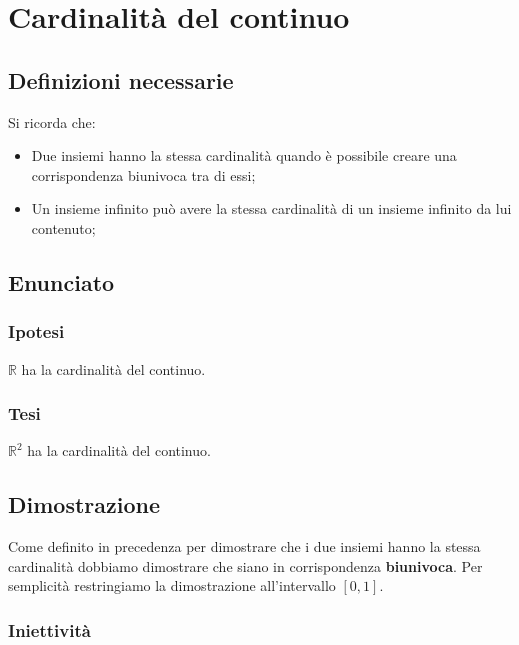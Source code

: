 \documentclass[../dimostrazioni]{subfiles}
\begin{document}
    \chapter{Cardinalità del continuo}

        \section*{Definizioni necessarie}

            Si ricorda che:

            \begin{itemize}
                \item Due insiemi hanno la stessa cardinalità quando è possibile creare una corrispondenza biunivoca tra di essi;
                \item Un insieme infinito può avere la stessa cardinalità di un insieme infinito da lui contenuto;
            \end{itemize}

        \section*{Enunciato}

            \subsection*{Ipotesi}

            \( \mathbb{R} \) ha la cardinalità del continuo.

            \subsection*{Tesi}

            \( \mathbb{R}^2 \) ha la cardinalità del continuo.                

        \section*{Dimostrazione}

            Come definito in precedenza per dimostrare che i due insiemi hanno la stessa cardinalità 
            dobbiamo dimostrare che siano in corrispondenza \textbf{biunivoca}. 
            Per semplicità restringiamo la dimostrazione all'intervallo \([0, 1]\).
            
            \subsection*{Iniettività}
\end{document}
